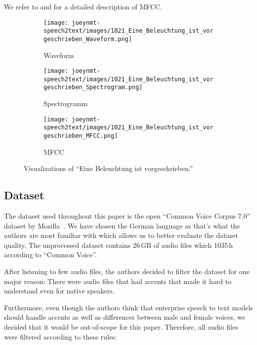 \documentclass[11pt,a4paper]{article}
\begin{document}
We refer to \cite{ittichaichareon2012speech} and \cite{singh2014approach} for a detailed description of MFCC.
 
\begin{figure*}[htb]
    \begin{subfigure}[b]{0.32\textwidth}
        \centering
        \texttt{[image: joeynmt-speech2text/images/1021\_Eine\_Beleuchtung\_ist\_vorgeschrieben\_Waveform.png]}
        \caption{Waveform}
        \label{fig:1021_waveform}
    \end{subfigure}
     \hfill
    \begin{subfigure}[b]{0.32\textwidth}
        \centering
        \texttt{[image: joeynmt-speech2text/images/1021\_Eine\_Beleuchtung\_ist\_vorgeschrieben\_Spectrogram.png]}
        \caption{Spectrogramm}
        \label{fig:1021_spectrogramm}
    \end{subfigure}
     \hfill
    \begin{subfigure}[b]{0.32\textwidth}
        \centering
        \texttt{[image: joeynmt-speech2text/images/1021\_Eine\_Beleuchtung\_ist\_vorgeschrieben\_MFCC.png]}
        \caption{MFCC}
        \label{fig:1021_mfcc}
    \end{subfigure}
    \caption{Visualizations of \enquote{Eine Beleuchtung ist vorgeschrieben.}}
    \label{fig:beleuchtung_viz}
\end{figure*}

\subsection{Dataset}
\label{subsec:dataset}

The dataset used throughout this paper is the open \enquote{Common Voice Corpus 7.0} dataset by Mozilla~\cite{commonvoice:2020}.
We have chosen the German language as that's what the authors are most familiar with which allows us to better evaluate the dataset quality.
The unprocessed dataset contains 26\,GB of audio files which 1035\,h according to \enquote{Common Voice}.

After listening to few audio files, the authors decided to filter the dataset for one major reason:
There were audio files that had accents that made it hard to understand even for native speakers.

Furthermore, even though the authors think that enterprise speech to text models
should handle accents as well as differences between male and female voices,
we decided that it would be out-of-scope for this paper.
Therefore, all audio files were filtered according to these rules:
\end{document}
